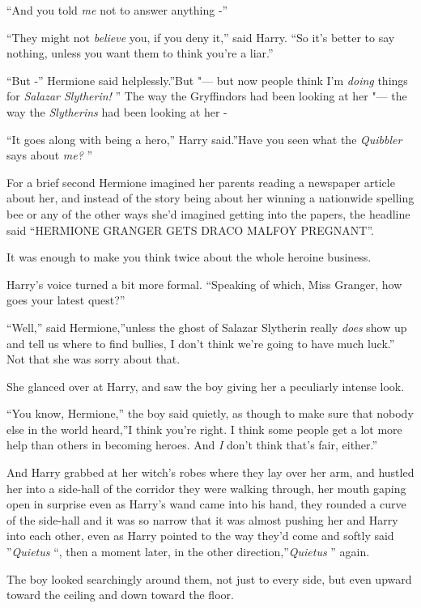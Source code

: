 ``And you told \emph{me} not to answer anything -''

``They might not \emph{believe} you, if you deny it,'' said Harry. ``So
it's better to say nothing, unless you want them to think you're a
liar.''

``But -'' Hermione said helplessly.''But "--- but now people think I'm
\emph{doing} things for \emph{Salazar Slytherin!} '' The way the
Gryffindors had been looking at her "--- the way the \emph{Slytherins} had
been looking at her -

``It goes along with being a hero,'' Harry said.''Have you seen what the
\emph{Quibbler} says about \emph{me?} ''

For a brief second Hermione imagined her parents reading a newspaper
article about her, and instead of the story being about her winning a
nationwide spelling bee or any of the other ways she'd imagined getting
into the papers, the headline said ``HERMIONE GRANGER GETS DRACO MALFOY
PREGNANT''.

It was enough to make you think twice about the whole heroine business.

Harry's voice turned a bit more formal. ``Speaking of which, Miss
Granger, how goes your latest quest?''

``Well,'' said Hermione,''unless the ghost of Salazar Slytherin really
\emph{does} show up and tell us where to find bullies, I don't think
we're going to have much luck.'' Not that she was sorry about that.

She glanced over at Harry, and saw the boy giving her a peculiarly
intense look.

``You know, Hermione,'' the boy said quietly, as though to make sure
that nobody else in the world heard,''I think you're right. I think some
people get a lot more help than others in becoming heroes. And \emph{I}
don't think that's fair, either.''

And Harry grabbed at her witch's robes where they lay over her arm, and
hustled her into a side-hall of the corridor they were walking through,
her mouth gaping open in surprise even as Harry's wand came into his
hand, they rounded a curve of the side-hall and it was so narrow that it
was almost pushing her and Harry into each other, even as Harry pointed
to the way they'd come and softly said ''\emph{Quietus} ``, then a moment
later, in the other direction,''\emph{Quietus} '' again.

The boy looked searchingly around them, not just to every side, but even
upward toward the ceiling and down toward the floor.


